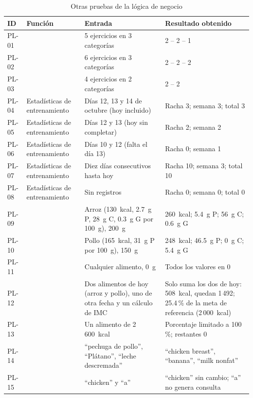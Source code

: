 \begin{table}[H]
\centering
\caption{Otras pruebas de la lógica de negocio}
\label{tab:prueba-otras}
\footnotesize
\begin{tabularx}{\textwidth}{|L{1.1cm}|L{4.1cm}|Y|Y|}
\hline
{} \textbf{ID} & \textbf{Función} & \textbf{Entrada} & \textbf{Resultado obtenido} \\
\hline
PL-01 &  & 5 ejercicios en 3 categorías & 2 -- 2 -- 1 \\ \hline
PL-02 &  & 6 ejercicios en 3 categorías & 2 -- 2 -- 2 \\ \hline
PL-03 &  & 4 ejercicios en 2 categorías & 2 -- 2 \\ \hline
PL-04 & Estadísticas de entrenamiento & Días 12, 13 y 14 de octubre (hoy
incluido) & Racha 3; semana 3; total 3 \\ \hline
PL-05 & Estadísticas de entrenamiento & Días 12 y 13 (hoy sin completar) &
Racha 2; semana 2 \\ \hline
PL-06 & Estadísticas de entrenamiento & Días 10 y 12 (falta el día 13) &
Racha 0; semana 1 \\ \hline
PL-07 & Estadísticas de entrenamiento & Diez días consecutivos hasta hoy &
Racha 10; semana 3; total 10 \\ \hline
PL-08 & Estadísticas de entrenamiento & Sin registros & Racha 0; semana 0;
total 0 \\ \hline
PL-09 &  & Arroz (130~kcal, 2.7~g P, 28~g C, 0.3~g
G por 100~g), 200~g & 260~kcal; 5.4~g P; 56~g C; 0.6~g G \\ \hline
PL-10 &  & Pollo (165~kcal, 31~g P por 100~g), 150~g
& 248~kcal; 46.5~g P; 0~g C; 5.4~g G \\ \hline
PL-11 &  & Cualquier alimento, 0~g & Todos los
valores en 0 \\ \hline
PL-12 &  & Dos alimentos de hoy (arroz y pollo),
uno de otra fecha y un cálculo de IMC & Solo suma los dos de hoy: 508~kcal,
quedan 1\,492; 25.4\,\% de la meta de referencia (2\,000~kcal) \\ \hline
PL-13 &  & Un alimento de 2\,600~kcal & Porcentaje
limitado a 100\,\%; restantes 0 \\ \hline
PL-14 &  & ``pechuga de pollo'', ``Plátano'',
``leche descremada'' & ``chicken breast'', ``banana'', ``milk nonfat'' \\ \hline
PL-15 &  & ``chicken'' y ``a'' & ``chicken'' sin
cambio; ``a'' no genera consulta \\
\hline
\end{tabularx}
\end{table}

